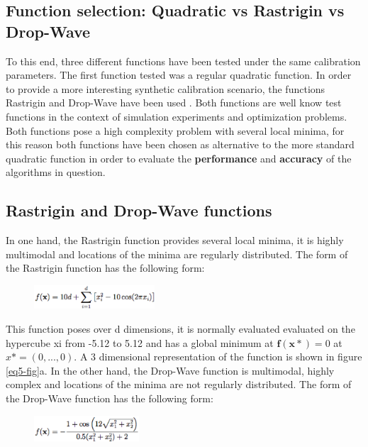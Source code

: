 \subsection{Function selection: Quadratic vs Rastrigin vs Drop-Wave}

To this end, three different functions have been tested under the same calibration parameters. The first function tested was a regular quadratic function. In order to provide a more interesting synthetic calibration scenario, the functions Rastrigin and Drop-Wave have been used \parencite{OTF}. Both functions are well know test functions in the context of simulation experiments and optimization problems. Both functions pose a high complexity problem with several local minima, for this reason both functions have been chosen as alternative to the more standard quadratic function in order to evaluate the \textbf{performance} and \textbf{accuracy} of the algorithms in question. 

\subsection{Rastrigin and Drop-Wave functions}
In one hand, the Rastrigin function provides several local minima, it is highly multimodal and locations of the minima are regularly distributed. The form of the Rastrigin function has the following form:

\begin{figure}[htpb]
  \centering
  \includegraphics[width=0.4\textwidth]{figures/rastrigin-function.png}
  \label{fig:eq4}
\end{figure}

This function poses over d dimensions, it is normally evaluated evaluated on the hypercube xi from -5.12 to 5.12 and has a global minimum at \(\boldsymbol{f(x*)} = 0\) at \(x* = (0, ..., 0)\). A 3 dimensional representation of the function is shown in figure \ref{eq5-fig}a. 
\vskip 0.2in
In the other hand, the Drop-Wave function is multimodal, highly complex and locations of the minima are not regularly distributed. The form of the Drop-Wave function has the following form:

\begin{figure}[htpb]
  \centering
  \includegraphics[width=0.35\textwidth]{figures/drop-wave-function.png}
  \label{fig:eq5}
\end{figure}

